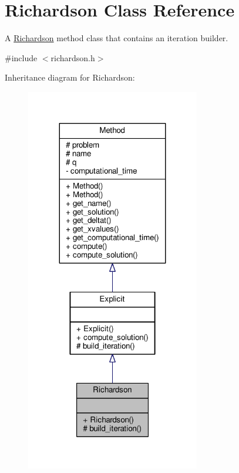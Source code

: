 \hypertarget{classRichardson}{}\section{Richardson Class Reference}
\label{classRichardson}


A \hyperlink{classRichardson}{Richardson} method class that contains an iteration builder.  




{\ttfamily \#include $<$richardson.\+h$>$}



Inheritance diagram for Richardson\+:
\nopagebreak
\begin{figure}[H]
\begin{center}
\leavevmode
\includegraphics[width=215pt]{classRichardson__inherit__graph}
\end{center}
\end{figure}


